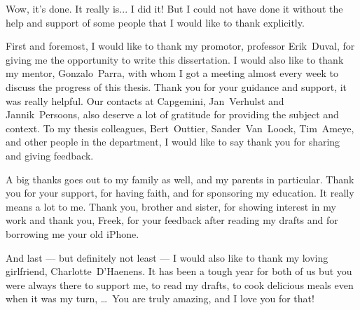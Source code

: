 \documentclass[master=cws,masteroption=se,english,a4paper]{kulemt}
\begin{document}
\begin{preface}
    Wow, it's done. It really is... I did it! But I could not have done it without the help and support of some people that I would like to thank explicitly.
    
    First and foremost, I would like to thank my promotor, professor \mbox{Erik~Duval}, for giving me the opportunity to write this dissertation. I would also like to thank my mentor, \mbox{Gonzalo Parra}, with whom I got a meeting almost every week to discuss the progress of this thesis. Thank you for your guidance and support, it was really helpful. Our contacts at Capgemini, \mbox{Jan~Verhulst} and \mbox{Jannik~Persoons}, also deserve a lot of gratitude for providing the subject and context. To my thesis colleagues, \mbox{Bert~Outtier}, \mbox{Sander~Van~Loock}, \mbox{Tim~Ameye}, and other people in the department, I would like to say thank you for sharing and giving feedback.
    
    A big thanks goes out to my family as well, and my parents in particular. Thank you for your support, for having faith, and for sponsoring my education. It really means a lot to me. Thank you, brother and sister, for showing interest in my work and thank you, Freek, for your feedback after reading my drafts and for borrowing me your old iPhone.
    
    And last --- but definitely not least --- I would also like to thank my loving girlfriend, \mbox{Charlotte~D'Haenens}. It has been a tough year for both of us but you were always there to support me, to read my drafts, to cook delicious meals even when it was my turn, \ldots\  You are truly amazing, and I love you for that!
\end{preface}

\tableofcontents*
\end{document}
